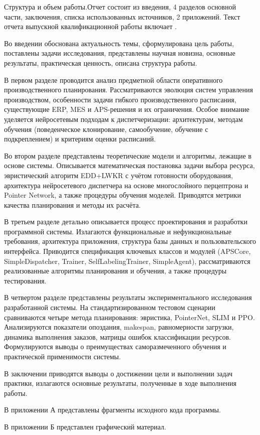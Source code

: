Структура и объем работы.Отчет состоит из введения, 4 разделов основной части, заключения, списка использованных источников, 2 приложений. Текст отчета выпускной квалификационной работы включает . %

Во введении обоснована актуальность темы, сформулирована цель работы, поставлены задачи исследования, представлены научная новизна, основные результаты, практическая ценность, описана структура работы.

В первом разделе проводится анализ предметной области оперативного производственного планирования. Рассматриваются эволюция систем управления производством, особенности задачи гибкого производственного расписания, существующие ERP, MES и APS-решения и их ограничения. Особое внимание уделяется нейросетевым подходам к диспетчеризации: архитектурам, методам обучения (поведенческое клонирование, самообучение, обучение с подкреплением) и критериям оценки расписаний.

Во втором разделе представлены теоретические модели и алгоритмы, лежащие в основе системы. Описывается математическая постановка задачи выбора ресурса, эвристический алгоритм EDD+LWKR с учётом готовности оборудования, архитектура нейросетевого диспетчера на основе многослойного перцептрона и Pointer Network, а также процедуры обучения моделей. Приводятся метрики качества планирования и методы их расчёта.

В третьем разделе детально описывается процесс проектирования и разработки программной системы. Излагаются функциональные и нефункциональные требования, архитектура приложения, структура базы данных и пользовательского интерфейса. Приводится спецификация ключевых классов и модулей (APSCore, SimpleDispatcher, Trainer, SelfLabelingTrainer, SimpleAgent), рассматриваются реализованные алгоритмы планирования и обучения, а также процедуры тестирования.

В четвертом разделе представлены результаты экспериментального исследования разработанной системы. На стандартизированном тестовом сценарии сравниваются четыре метода планирования: эвристика, PointerNet, SLIM и PPO. Анализируются показатели опоздания, makespan, равномерности загрузки, динамика выполнения заказов, матрицы ошибок классификации ресурсов. Формулируются выводы о преимуществах саморазмеченного обучения и практической применимости системы.

В заключении приводятся выводы о достижении цели и выполнении задач практики, излагаются основные результаты, полученные в ходе выполнения работы.

В приложении А представлены фрагменты исходного кода программы.

В приложении Б представлен графический материал.

